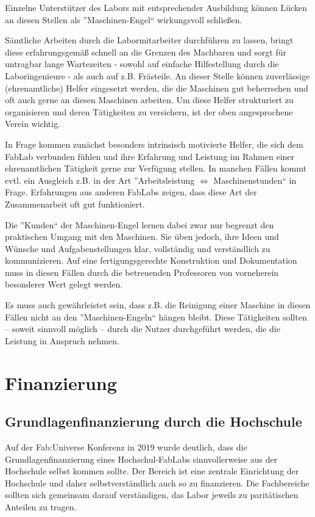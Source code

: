 \documentclass[parskip=half,headsepline,footsepline,titlepage]{scrartcl}
\begin{document}
Einzelne Unterstützer des Labors mit entsprechender Ausbildung können Lücken an diesen Stellen als ''Maschinen-Engel`` wirkungsvoll schließen.

Sämtliche Arbeiten durch die Labormitarbeiter durchführen zu lassen, bringt diese erfahrungsgemäß schnell an die Grenzen des Machbaren und sorgt für untragbar lange Wartezeiten - sowohl auf einfache Hilfestellung durch die Laboringenieure - als auch auf z.B. Frästeile. An dieser Stelle können zuverlässige (ehrenamtliche) Helfer eingesetzt werden, die die Maschinen gut beherrschen und oft auch gerne an diesen Maschinen arbeiten. Um diese Helfer strukturiert zu organisieren und deren Tätigkeiten zu versichern, ist der oben angesprochene Verein wichtig.

In Frage kommen zunächst besonders intrinsisch motivierte Helfer, die sich dem FabLab verbunden fühlen und ihre Erfahrung und Leistung im Rahmen einer ehrenamtlichen Tätigkeit gerne zur Verfügung stellen. In manchen Fällen kommt evtl. ein Ausgleich z.B. in der Art ''Arbeitsleistung $\Leftrightarrow$ Maschinenstunden`` in Frage.
Erfahrungen aus anderen FabLabs zeigen, dass diese Art der Zusammenarbeit oft gut funktioniert.

Die ''Kunden`` der Maschinen-Engel lernen dabei zwar nur begrenzt den praktischen Umgang mit den Maschinen. Sie üben jedoch, ihre Ideen und Wünsche und Aufgabenstellungen klar, vollständig und verständlich zu kommunizieren. Auf eine fertigungsgerechte Konstruktion und Dokumentation muss in diesen Fällen durch die betreuenden Professoren von vorneherein besonderer Wert gelegt werden.

Es muss auch gewährleistet sein, dass z.B. die Reinigung einer Maschine in diesen Fällen nicht an den ''Maschinen-Engeln`` hängen bleibt. Diese Tätigkeiten sollten -- soweit sinnvoll möglich -- durch die Nutzer durchgeführt werden, die die Leistung in Anspruch nehmen.


\section{Finanzierung}

\subsection{Grundlagenfinanzierung durch die Hochschule}
Auf der Fab:Universe Konferenz in 2019 wurde deutlich, dass die Grundlagenfinanzierung eines Hochschul-FabLabs sinnvollerweise aus der Hochschule selbst kommen sollte. Der Bereich ist eine zentrale Einrichtung der Hochschule und daher selbstverständlich auch so zu finanzieren. Die Fachbereiche sollten sich gemeinsam darauf verständigen, das Labor jeweils zu paritätischen Anteilen zu tragen.
\end{document}
